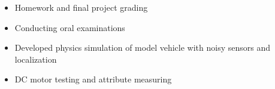 \divider

    \begin{itemize}
        \item   \small{Homework and final project grading}
        \item   \small{Conducting oral examinations} \\
    \end{itemize}
\divider
    

\begin{itemize}
    \item   \small{Developed physics simulation of model vehicle with noisy sensors and localization}
    \item   \small{DC motor testing and attribute measuring} \\
\end{itemize}


